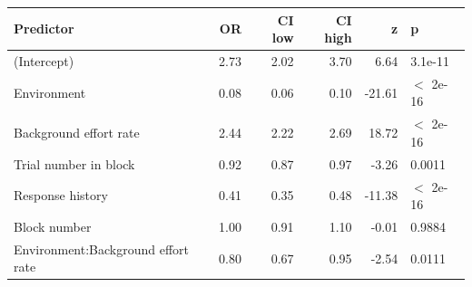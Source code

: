 \begin{table}[ht]
\centering
\begin{tabular}{lrrrrl}
  \hline
Predictor & OR & CI low & CI high & z & p \\ 
  \hline
(Intercept) & 2.73 & 2.02 & 3.70 & 6.64 & 3.1e-11 \\ 
  Environment & 0.08 & 0.06 & 0.10 & -21.61 & $<$ 2e-16 \\ 
  Background effort rate & 2.44 & 2.22 & 2.69 & 18.72 & $<$ 2e-16 \\ 
  Trial number in block & 0.92 & 0.87 & 0.97 & -3.26 & 0.0011 \\ 
  Response history & 0.41 & 0.35 & 0.48 & -11.38 & $<$ 2e-16 \\ 
  Block number & 1.00 & 0.91 & 1.10 & -0.01 & 0.9884 \\ 
  Environment:Background effort rate & 0.80 & 0.67 & 0.95 & -2.54 & 0.0111 \\ 
   \hline
\end{tabular}
\end{table}
